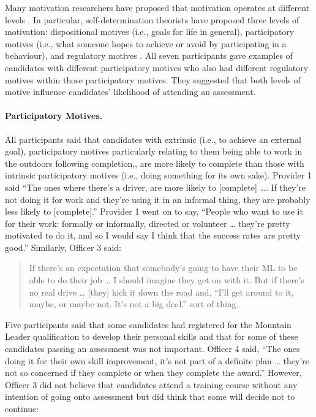 \documentclass[
  12pt,
  a4paper,
]{book}
\begin{document}
Many motivation researchers have proposed that motivation operates at different levels \citep[e.g.,][]{Vallerand1997, Vallerand1992}. In particular, self-determination theorists have proposed three levels of motivation: dispositional motives (i.e., goals for life in general), participatory motives (i.e., what someone hopes to achieve or avoid by participating in a behaviour), and regulatory motives \citep[i.e., the perceived loci of causality of behavioural goals; e.g.,][]{Deci2000, Ingledew2009}. All seven participants gave examples of candidates with different participatory motives who also had different regulatory motives within those participatory motives. They suggested that both levels of motive influence candidates' likelihood of attending an assessment.

\hypertarget{qual-part-motives}{%
\paragraph{Participatory Motives.}\label{qual-part-motives}}

All participants said that candidates with extrinsic (i.e., to achieve an external goal), participatory motives particularly relating to them being able to work in the outdoors following completion,, are more likely to complete than those with intrinsic participatory motives (i.e., doing something for its own sake). Provider 1 said ``The ones where there's a driver, are more likely to {[}complete{]} \ldots. If they're not doing it for work and they're using it in an informal thing, they are probably less likely to {[}complete{]}.'' Provider 1 went on to say, ``People who want to use it for their work: formally or informally, directed or volunteer \ldots{} they're pretty motivated to do it, and so I would say I think that the success rates are pretty good.'' Similarly, Officer 3 said:

\begin{quote}
If there's an expectation that somebody's going to have their ML to be able to do their job \ldots{} I should imagine they get on with it. But if there's no real drive \ldots{} {[}they{]} kick it down the road and, ``I'll get around to it, maybe, or maybe not. It's not a big deal.'' sort of thing.
\end{quote}

Five participants said that some candidates had registered for the Mountain Leader qualification to develop their personal skills and that for some of these candidates passing an assessment was not important. Officer 4 said, ``The ones doing it for their own skill improvement, it's not part of a definite plan \ldots{} they're not so concerned if they complete or when they complete the award.'' However, Officer 3 did not believe that candidates attend a training course without any intention of going onto assessment but did think that some will decide not to continue:
\end{document}
